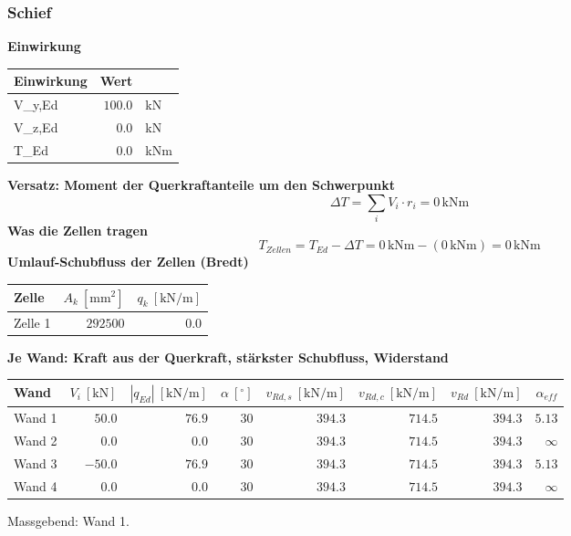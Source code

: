 \documentclass[11pt,a4paper]{article}
\begin{document}
\subsubsection{Schief}
\noindent\textbf{Einwirkung}
\begin{longtable}{lrl}
\hline
Einwirkung & Wert &  \\
\hline
\endhead
V\_y,Ed & $100.0$ & kN \\
V\_z,Ed & $0.0$ & kN \\
T\_Ed & $0.0$ & kNm \\
\hline
\end{longtable}
\noindent\textbf{Versatz: Moment der Querkraftanteile um den Schwerpunkt}
\begin{equation*}
\Delta T = \sum_i V_i \cdot r_i = 0\,\mathrm{kNm}
\end{equation*}
\noindent\textbf{Was die Zellen tragen}
\begin{equation*}
T_{Zellen} = T_{Ed} - \Delta T = 0\,\mathrm{kNm} - \left(0\,\mathrm{kNm}\right) = 0\,\mathrm{kNm}
\end{equation*}
\noindent\textbf{Umlauf-Schubfluss der Zellen (Bredt)}
\begin{longtable}{lrr}
\hline
Zelle & $A_k\ [\mathrm{mm}^2]$ & $q_k\ [\mathrm{kN/m}]$ \\
\hline
\endhead
Zelle 1 & $292500$ & $0.0$ \\
\hline
\end{longtable}
\noindent\textbf{Je Wand: Kraft aus der Querkraft, stärkster Schubfluss, Widerstand}
\begin{longtable}{lrrrrrrr}
\hline
Wand & $V_i\ [\mathrm{kN}]$ & $|q_{Ed}|\ [\mathrm{kN/m}]$ & $\alpha\ [{}^{\circ}]$ & $v_{Rd,s}\ [\mathrm{kN/m}]$ & $v_{Rd,c}\ [\mathrm{kN/m}]$ & $v_{Rd}\ [\mathrm{kN/m}]$ & $\alpha_{eff}$ \\
\hline
\endhead
Wand 1 & $50.0$ & $76.9$ & $30$ & $394.3$ & $714.5$ & $394.3$ & $5.13$ \\
Wand 2 & $0.0$ & $0.0$ & $30$ & $394.3$ & $714.5$ & $394.3$ & $\infty$ \\
Wand 3 & $-50.0$ & $76.9$ & $30$ & $394.3$ & $714.5$ & $394.3$ & $5.13$ \\
Wand 4 & $0.0$ & $0.0$ & $30$ & $394.3$ & $714.5$ & $394.3$ & $\infty$ \\
\hline
\end{longtable}
Massgebend: Wand 1.
\end{document}
